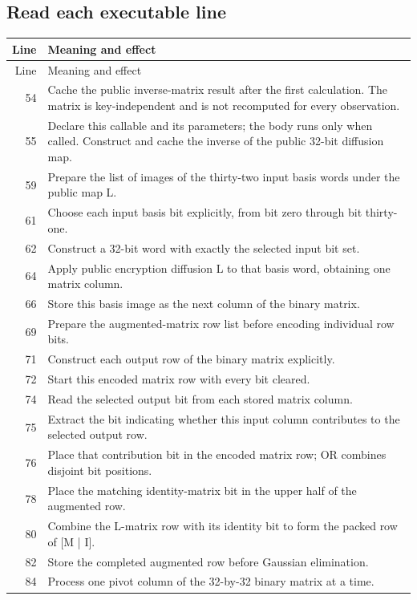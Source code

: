 \subsection*{Read each executable line}
\begingroup\small\begin{longtable}{r >{\raggedright\arraybackslash}p{138mm}}\toprule Line&Meaning and effect\\\midrule\endfirsthead\toprule Line&Meaning and effect\\\midrule\endhead
54&Cache the public inverse-matrix result after the first calculation. The matrix is key-independent and is not recomputed for every observation.\\
55&Declare this callable and its parameters; the body runs only when called. Construct and cache the inverse of the public 32-bit diffusion map.\\
59&Prepare the list of images of the thirty-two input basis words under the public map L.\\
61&Choose each input basis bit explicitly, from bit zero through bit thirty-one.\\
62&Construct a 32-bit word with exactly the selected input bit set.\\
64&Apply public encryption diffusion L to that basis word, obtaining one matrix column.\\
66&Store this basis image as the next column of the binary matrix.\\
69&Prepare the augmented-matrix row list before encoding individual row bits.\\
71&Construct each output row of the binary matrix explicitly.\\
72&Start this encoded matrix row with every bit cleared.\\
74&Read the selected output bit from each stored matrix column.\\
75&Extract the bit indicating whether this input column contributes to the selected output row.\\
76&Place that contribution bit in the encoded matrix row; OR combines disjoint bit positions.\\
78&Place the matching identity-matrix bit in the upper half of the augmented row.\\
80&Combine the L-matrix row with its identity bit to form the packed row of [M | I].\\
82&Store the completed augmented row before Gaussian elimination.\\
84&Process one pivot column of the 32-by-32 binary matrix at a time.\\

\end{longtable}
